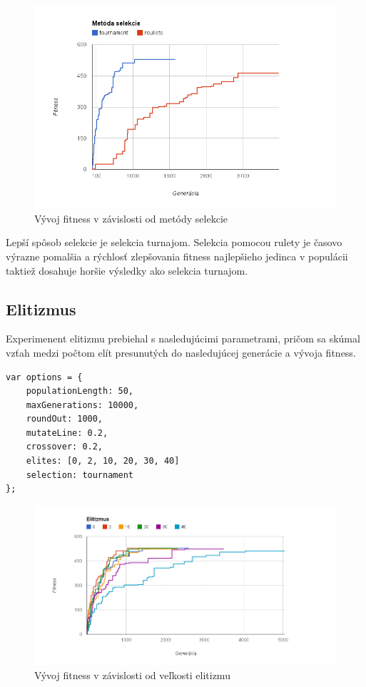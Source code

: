 \begin{figure}[H]
	\centering
	\includegraphics[width=1.0\textwidth]{selection.png}
	\caption[Vývoj fitness v závislosti od metódy selekcie]{
		Vývoj fitness v závislosti od metódy selekcie}
	\label{fig: selection}
\end{figure}

Lepší spôsob selekcie je selekcia turnajom. Selekcia pomocou rulety je časovo výrazne pomalšia a rýchlosť zlepšovania fitness najlepšieho jedinca v populácii taktiež dosahuje horšie výsledky ako selekcia turnajom.



\subsection{Elitizmus} %
\label{sub:elitizmus}

Experimenent elitizmu prebiehal s nasledujúcimi parametrami, pričom sa skúmal vzťah medzi počtom elít presunutých do nasledujúcej generácie a vývoja fitness.

\begin{verbatim}
var options = {
    populationLength: 50,
    maxGenerations: 10000,
    roundOut: 1000,
    mutateLine: 0.2,
    crossover: 0.2,
    elites: [0, 2, 10, 20, 30, 40]
    selection: tournament
};
\end{verbatim}

\begin{figure}[H]
	\centering
	\includegraphics[width=1.0\textwidth]{elites.png}
	\caption[Vývoj fitness v závislosti od veľkosti elitizmu]{
		Vývoj fitness v závislosti od veľkosti elitizmu}
	\label{fig: selection}
\end{figure}

